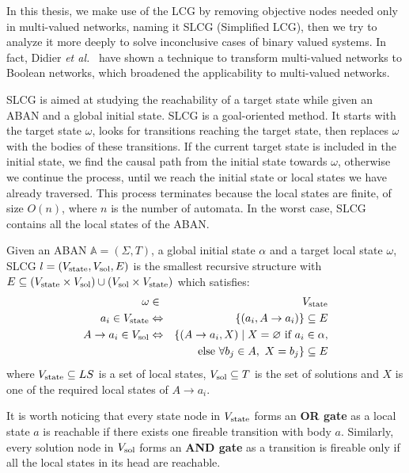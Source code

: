 In this thesis, we make use of the LCG by removing objective nodes needed only in multi-valued networks, naming it SLCG (Simplified LCG), then we try to analyze it more deeply to solve inconclusive cases of binary valued systems.
In fact, Didier \textit{et al.}~\cite{didier2011mapping} have shown a technique to transform multi-valued networks to Boolean networks, which broadened the applicability to multi-valued networks.

SLCG is aimed at studying the reachability of a target state while given an ABAN and a global initial state.
SLCG is a goal-oriented method.
It starts with the target state $\omega$, looks for transitions reaching the target state, then replaces $\omega$ with the bodies of these transitions.
If the current target state is included in the initial state, we find the causal path from the initial state towards $\omega$, otherwise we continue the process, until we reach the initial state or local states we have already traversed.
This process terminates because the local states are finite, of size $O(n)$, where $n$ is the number of automata.
In the worst case, SLCG contains all the local states of the ABAN.

\begin{definition}\label{defSLCG}
Given an ABAN $\mathbb{A} = (\Sigma,T)$, a global initial state $\alpha$ and a target local state $\omega$, SLCG $l= (V_{\mathrm{state}},V_{\mathrm{sol}},E)$ is the smallest recursive structure with $E \subseteq (V_{\mathrm{state}}\times V_{\mathrm{sol}})\cup (V_{\mathrm{sol}}\times V_{\mathrm{state}})$ which satisfies:
\begin{eqnarray*}
    \omega&\in& V_{\mathrm{state}} \\
    a_i\in V_{\mathrm{state}} &\Leftrightarrow& \{ (a_i, A\to a_i)\}\subseteq E \\
    A\to a_i\in V_{\mathrm{sol}}&\Leftrightarrow& \{ (A\to a_i,X)\mid X= \varnothing \text{ if } a_i\in \alpha,\\
    &&\text{else }\forall b_j\in A,\ X= b_j\}\subseteq E
\end{eqnarray*}
where $V_{\mathrm{state}}\subseteq LS$ is a set of local states, $V_{\mathrm{sol}}\subseteq T$ is the set of solutions and $X$ is one of the required local states of $A\to a_i$.
\end{definition}

It is worth noticing that every state node in $V_{\mathrm{state}}$ forms an \textbf{OR gate} as a local state $a$ is reachable if there exists one fireable transition with body $a$.
Similarly, every solution node in $V_{\mathrm{sol}}$ forms an \textbf{AND gate} as a transition is fireable only if all the local states in its head are reachable.

